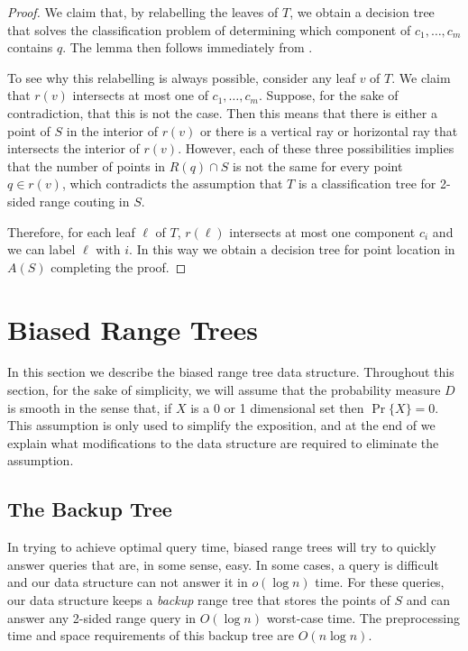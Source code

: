 \documentclass[lotsofwhite,charterfonts]{patmorin}
\begin{document}
\begin{proof}
We claim that, by relabelling the leaves of $T$, we obtain a decision
tree that solves the classification problem of determining which
component of $c_1,\ldots,c_m$ contains $q$.  The lemma then follows
immediately from .

To see why this relabelling is always possible, consider any leaf $v$
of $T$. We claim that $r(v)$ intersects at most one of
$c_1,\ldots,c_m$.  Suppose, for the sake of contradiction, that this
is not the case.  Then this means that there is either a point of $S$
in the interior of $r(v)$ or there is a vertical ray or horizontal ray
that intersects the interior of $r(v)$.  However, each of these three
possibilities implies that the number of points in $R(q)\cap S$ is not
the same for every point $q\in r(v)$, which contradicts the assumption
that $T$ is a classification tree for 2-sided range couting in $S$.

Therefore, for each leaf $\ell$ of $T$, $r(\ell)$ intersects at most one
component $c_i$ and we can label $\ell$ with $i$.  In this way we obtain
a decision tree for point location in $A(S)$ completing the proof.
\end{proof}

\section{Biased Range Trees}

In this section we describe the biased range tree data structure.
Throughout this section, for the sake of simplicity, we will assume
that the probability measure $D$ is smooth in the sense that, if $X$
is a 0 or 1 dimensional set then $\Pr\{X\}=0$.  This assumption is
only used to simplify the exposition, and at the end of
 we explain what modifications to the data structure
are required to eliminate the assumption.

\subsection{The Backup Tree}

In trying to achieve optimal query time, biased range trees will try
to quickly answer queries that are, in some sense, easy.  In some
cases, a query is difficult and our data structure can not answer it
in $o(\log n)$ time.  For these queries, our data structure keeps a
\emph{backup} range tree that stores the points of $S$ and can answer
any 2-sided range query in $O(\log n)$ worst-case time.  The
preprocessing time and space requirements of this backup tree are
$O(n\log n)$.
\end{document}
